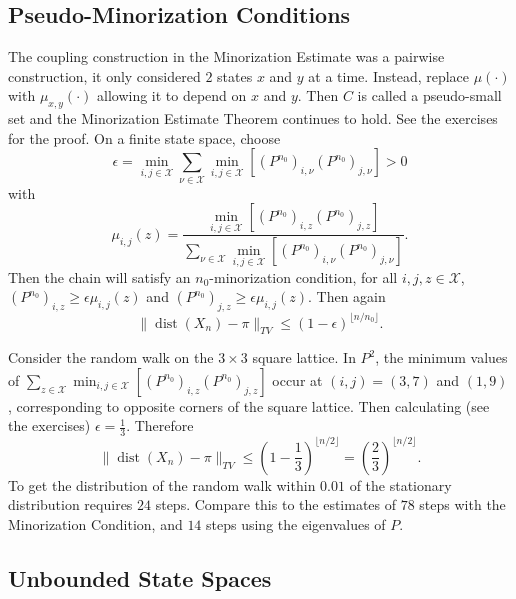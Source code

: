 \documentclass[12pt]{article}
\begin{document}
\subsection*{Pseudo-Minorization Conditions}

The coupling construction in the Minorization Estimate was a pairwise
construction, it only considered \( 2 \) states \( x \) and \( y \) at a
time. Instead, replace \( \mu(\cdot) \) with \( \mu_{x,y}(\cdot) \)
allowing it to depend on \( x \) and \( y \).  Then \( C \) is called a
pseudo-small set and the Minorization Estimate Theorem continues to
hold.  See the exercises for the proof.  On a finite state space, choose
\[
    \epsilon = \min_{i,j \in \mathcal{X}}\sum_{\nu \in \mathcal{X}} \min_
    {i,j \in \mathcal{X}} \left[ (P^{n_0})_{i,\nu} (P^{n_0})_{j,\nu}
    \right] > 0
\] with
\[
    \mu_{i,j}(z) = \frac{\min_{i,j \in \mathcal{X}} \left[ (P^{n_0})_{i,z}
    (P^{n_0})_{j,z} \right]}{\sum_{\nu \in \mathcal{X}} \min_{i,j \in
    \mathcal{X}} \left[ (P^{n_0})_{i,\nu} (P^{n_0})_{j,\nu} \right] }.
\] Then the chain will satisfy an \( n_0 \)-minorization condition, for
all \( i,j,z \in \mathcal{X} \), \( (P^{n_0})_{i,z} \ge \epsilon \mu_{i,j}
(z) \) and \( (P^{n_0})_{j,z} \ge \epsilon \mu_{i,j}(z) \).  Then again
\[
    \|
    \operatorname{dist}
    (X_n) - \pi \|_{TV} \le (1-\epsilon)^{\lfloor n/n_0 \rfloor}.
\]

\begin{example}
    Consider the random walk on the \( 3 \times 3 \) square lattice.  In
    \( P^2 \), the minimum values of \( \sum_{z \in \mathcal{X}} \min_{i,j
    \in \mathcal{X}} \left[ (P^{n_0})_{i,z} (P^{n_0})_{j,z} \right] \)
    occur at \( (i,j) = (3,7) \) and \( (1,9) \), corresponding to
    opposite corners of the square lattice.  Then calculating (see the
    exercises) \( \epsilon = \frac{1}{3} \).  Therefore
    \[
        \|
        \operatorname{dist}
        (X_n) - \pi \|_{TV} \le (1-\frac{1}{3})^{\lfloor n/2 \rfloor} =
        \left( \frac{2}{3} \right)^{\lfloor n/2 \rfloor}.
    \] To get the distribution of the random walk within \( 0.01 \) of
    the stationary distribution requires \( 24 \) steps.  Compare this
    to the estimates of \( 78 \) steps with the Minorization Condition,
    and \( 14 \) steps using the eigenvalues of \( P \).
\end{example}

\subsection*{Unbounded State Spaces}
\end{document}
